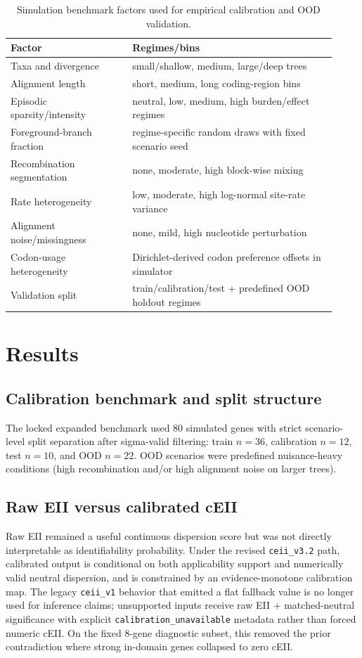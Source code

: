 \documentclass[11pt]{article}
\begin{document}
\begin{table}[t]
\centering
\caption{Simulation benchmark factors used for empirical calibration and OOD validation.}
\begin{tabular}{p{0.34\linewidth} p{0.58\linewidth}}
\hline
Factor & Regimes/bins \\
\hline
Taxa and divergence & small/shallow, medium, large/deep trees \\
Alignment length & short, medium, long coding-region bins \\
Episodic sparsity/intensity & neutral, low, medium, high burden/effect regimes \\
Foreground-branch fraction & regime-specific random draws with fixed scenario seed \\
Recombination segmentation & none, moderate, high block-wise mixing \\
Rate heterogeneity & low, moderate, high log-normal site-rate variance \\
Alignment noise/missingness & none, mild, high nucleotide perturbation \\
Codon-usage heterogeneity & Dirichlet-derived codon preference offsets in simulator \\
Validation split & train/calibration/test + predefined OOD holdout regimes \\
\hline
\end{tabular}
\end{table}

\section{Results}

\subsection{Calibration benchmark and split structure}

The locked expanded benchmark used 80 simulated genes with strict scenario-level split separation after sigma-valid filtering: train $n=36$, calibration $n=12$, test $n=10$, and OOD $n=22$. OOD scenarios were predefined nuisance-heavy conditions (high recombination and/or high alignment noise on larger trees).

\subsection{Raw EII versus calibrated cEII}

Raw EII remained a useful continuous dispersion score but was not directly interpretable as identifiability probability. Under the revised \texttt{ceii\_v3.2} path, calibrated output is conditional on both applicability support and numerically valid neutral dispersion, and is constrained by an evidence-monotone calibration map. The legacy \texttt{ceii\_v1} behavior that emitted a flat fallback value is no longer used for inference claims; unsupported inputs receive raw EII + matched-neutral significance with explicit \texttt{calibration\_unavailable} metadata rather than forced numeric cEII. On the fixed 8-gene diagnostic subset, this removed the prior contradiction where strong in-domain genes collapsed to zero cEII.
\end{document}
